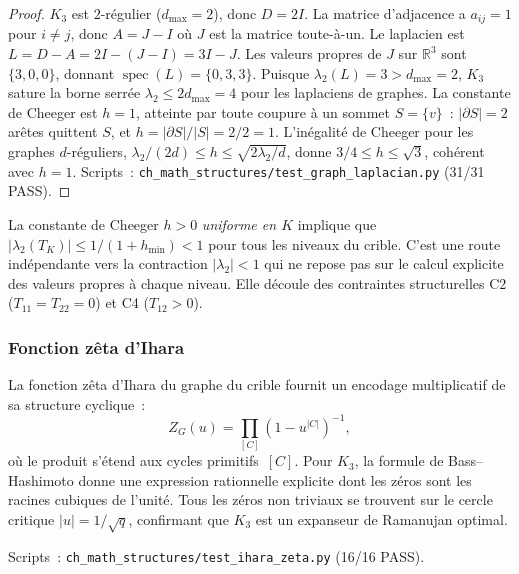 \documentclass[12pt,a4paper]{article}
\begin{document}
\begin{proof}
$K_3$ est $2$-régulier ($d_{\max} = 2$), donc $D = 2I$.
La matrice d'adjacence a $a_{ij} = 1$ pour $i \neq j$, donc
$A = J - I$ où $J$ est la matrice toute-à-un.
Le laplacien est $L = D - A = 2I - (J - I) = 3I - J$.
Les valeurs propres de $J$ sur $\mathbb{R}^3$ sont $\{3, 0, 0\}$,
donnant $\operatorname{spec}(L) = \{0, 3, 3\}$.
Puisque $\lambda_2(L) = 3 > d_{\max} = 2$, $K_3$ sature la borne
serrée $\lambda_2 \leq 2d_{\max} = 4$ pour les laplaciens de graphes.
La constante de Cheeger est $h = 1$, atteinte par toute coupure à un
sommet $S = \{v\}$~: $|\partial S| = 2$ arêtes quittent $S$, et
$h = |\partial S|/|S| = 2/2 = 1$.
L'inégalité de Cheeger pour les graphes $d$-réguliers,
$\lambda_2/(2d) \leq h \leq \sqrt{2\lambda_2/d}$, donne
$3/4 \leq h \leq \sqrt{3}$, cohérent avec $h = 1$.
Scripts~: \texttt{ch\_math\_structures/test\_graph\_laplacian.py}
(31/31 PASS).
\end{proof}

\begin{remarque}
\label{rem:expander_matters_ext}
La constante de Cheeger $h > 0$ \emph{uniforme en $K$} implique que
$|\lambda_2(T_K)| \leq 1/(1 + h_{\min}) < 1$ pour tous les niveaux du
crible. C'est une route indépendante vers la contraction
$|\lambda_2| < 1$ qui ne repose pas sur le calcul explicite des
valeurs propres à chaque niveau. Elle découle des contraintes
structurelles C2 ($T_{11} = T_{22} = 0$) et C4 ($T_{12} > 0$).
\end{remarque}

\subsubsection{Fonction zêta d'Ihara}
\label{subsec:ch7b_ihara}

La fonction zêta d'Ihara du graphe du crible fournit un encodage
multiplicatif de sa structure cyclique~:
\begin{equation}
  Z_G(u) = \prod_{[C]} (1 - u^{|C|})^{-1},
  \label{eq:ihara_ext}
\end{equation}
où le produit s'étend aux cycles primitifs~$[C]$.
Pour $K_3$, la formule de Bass--Hashimoto donne une expression
rationnelle explicite dont les zéros sont les racines cubiques de
l'unité. Tous les zéros non triviaux se trouvent sur le cercle
critique $|u| = 1/\sqrt{q}$, confirmant que $K_3$ est un expanseur
de Ramanujan optimal.

Scripts~: \texttt{ch\_math\_structures/test\_ihara\_zeta.py}
(16/16 PASS).
\end{document}
